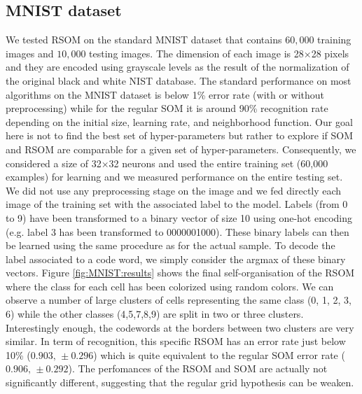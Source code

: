
\subsection{MNIST dataset}

We tested RSOM on the standard MNIST dataset \citep{Lecun:1998} that contains $60,000$ training images and $10,000$ testing images. The dimension of each image is 28$\times$28 pixels and they are encoded using grayscale levels as the result of the normalization of the original black and white NIST database. The standard performance on most algorithms on the MNIST dataset is below 1\% error rate (with or without preprocessing) while for the regular SOM it is around 90\% recognition rate depending on the initial size, learning rate, and neighborhood function. Our goal here is not to find the best set of hyper-parameters but rather to explore if SOM and RSOM are comparable for a given set of hyper-parameters. Consequently, we considered a size of 32$\times$32 neurons and used the entire training set (60,000 examples) for learning and we measured performance on the entire testing set. We did not use any preprocessing stage on the image and we fed directly each image of the training set with the associated label to the model. Labels (from 0 to 9) have been transformed to a binary vector of size 10 using one-hot encoding (e.g. label 3 has been transformed to 0000001000). These binary labels can then be learned using the same procedure as for the actual sample. To decode the label associated to a code word, we simply consider the argmax of these binary vectors. Figure \ref{fig:MNIST:results} shows the final self-organisation of the RSOM where the class for each cell has been colorized using random colors. We can observe a number of large clusters of cells representing the same class (0, 1, 2, 3, 6) while the other classes (4,5,7,8,9) are split in two or three clusters. Interestingly enough, the codewords at the borders between two clusters are very similar. In term of recognition, this specific RSOM has an error rate just below 10\% ($0.903,\, \pm 0.296$) which is quite equivalent to the regular SOM error rate ($0.906,\, \pm 0.292$). The perfomances of the RSOM and SOM are actually not significantly different, suggesting that the regular grid hypothesis can be weaken.

